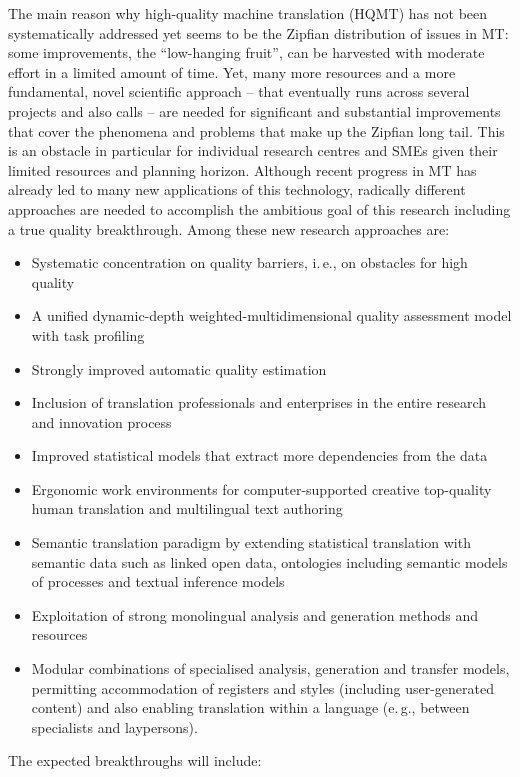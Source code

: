 \documentclass[10pt, plain]{../../metanetpaper}
\begin{document}
\begin{multicols}{2}
The main reason why high-quality machine translation (HQMT) has not been systematically addressed yet seems to be the Zipfian distribution of issues in MT: some improvements, the “low-hanging fruit”, can be harvested with moderate effort in a limited amount of time. Yet, many more resources and a more fundamental, novel scientific approach -- that eventually runs across several projects and also calls -- are needed for significant and substantial improvements that cover the phenomena and problems that make up the Zipfian long tail. This is an obstacle in particular for individual research centres and SMEs given their limited resources and planning horizon. Although recent progress in MT has already led to many new applications of this technology, radically different approaches are needed to accomplish the ambitious goal of this research including a true quality breakthrough. Among these new research approaches are:

\begin{itemize}
\item Systematic concentration on quality barriers, i.\,e., on obstacles for high quality
\item A unified dynamic-depth weighted-multidimensional quality assessment model with task profiling
\item Strongly improved automatic quality estimation
\item Inclusion of translation professionals and enterprises in the entire research and innovation process
\item Improved statistical models that extract more dependencies from the data
\item Ergonomic work environments for computer-supported creative top-quality human translation and multilingual text authoring
\item Semantic translation paradigm by extending statistical translation with semantic data such as linked open data, ontologies including semantic models of processes and textual inference models
\item Exploitation of strong monolingual analysis and generation methods and resources
\item Modular combinations of specialised analysis, generation and transfer models, permitting accommodation of registers and styles (including user-generated content) and also enabling translation within a language (e.\,g., between specialists and laypersons).
\end{itemize}

The expected breakthroughs will include:


\end{multicols}
\end{document}
